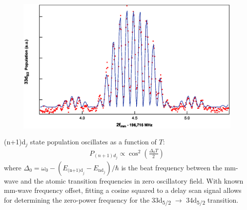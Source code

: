 \documentclass[landscape]{sciposter}
\begin{document}
\begin{multicols}{4}
\begin{figure}
	\begin{center}
		\includegraphics[scale = 1]{fringes.eps}
		\caption{ }
		\label{Ramsey fringes}
	\end{center}
\end{figure}
(n+1)d$_j$ state population oscillates as a function of $T$: 
\begin{align*}
\boxed{P_{(n+1)d_j} \propto {\cos}^{2}\left(\frac{\Delta_{0} T}{2}\right)}
\end{align*}
where $\Delta_0=\omega_0-(E_{\text{(n+1)d}_j}-E_{\text{nd}_j})/\hbar$ is the beat frequency between the mm-wave and the atomic transition frequencies in zero oscillatory field. With known mm-wave frequency offset, fitting a cosine squared to a delay scan signal allows for determining the zero-power frequency for the 33d\textsubscript{5/2} $\rightarrow$ 34d\textsubscript{5/2} transition.


\end{multicols}
\end{document}
